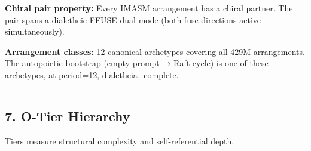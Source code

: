 \documentclass[12pt,a4paper]{article}
\begin{document}
\textbf{Chiral pair property:} Every IMASM arrangement has a chiral
partner. The pair spans a dialetheic FFUSE dual mode (both fuse
directions active simultaneously).

\textbf{Arrangement classes:} 12 canonical archetypes covering all 429M
arrangements. The autopoietic bootstrap (empty prompt → Raft cycle) is
one of these archetypes, at period=12, dialetheia\_complete.

\begin{center}\rule{0.5\linewidth}{0.5pt}\end{center}

\hypertarget{o-tier-hierarchy}{%
\subsection{7. O-Tier Hierarchy}\label{o-tier-hierarchy}}

Tiers measure structural complexity and self-referential depth.
\end{document}
